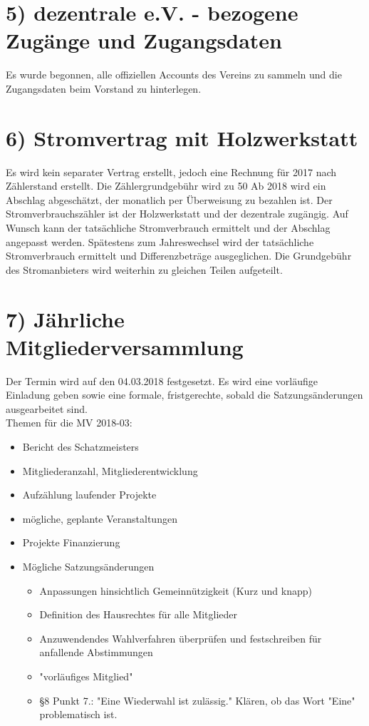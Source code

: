 \documentclass[10pt,a4paper]{scrartcl}
\newcommand{\qs}[1]{"#1"}
\begin{document}
\section*{5) dezentrale e.V. - bezogene Zug{\"a}nge und Zugangsdaten}
Es wurde begonnen, alle offiziellen Accounts des Vereins zu sammeln und die Zugangsdaten beim Vorstand zu hinterlegen.

\section*{6) Stromvertrag mit Holzwerkstatt}
	Es wird kein separater Vertrag erstellt, jedoch eine Rechnung für 2017 nach Z{\"a}hlerstand erstellt.
	Die Z{\"a}hlergrundgeb{\"u}hr wird zu 50%
	Ab 2018 wird ein Abschlag abgesch{\"a}tzt, der monatlich per {\"U}berweisung zu bezahlen ist.
	Der Stromverbrauchsz{\"a}hler ist der Holzwerkstatt und der dezentrale zug{\"a}ngig.
	Auf Wunsch kann der tats{\"a}chliche Stromverbrauch ermittelt und der Abschlag angepasst werden.
	Sp{\"a}testens zum Jahreswechsel wird der tats{\"a}chliche Stromverbrauch ermittelt und Differenzbetr{\"a}ge ausgeglichen.
	Die Grundgeb{\"u}hr des Stromanbieters wird weiterhin zu gleichen Teilen aufgeteilt.

\section*{7) J{\"a}hrliche Mitgliederversammlung}
	Der Termin wird auf den 04.03.2018 festgesetzt. Es wird eine vorl{\"a}ufige Einladung geben sowie eine formale,
	fristgerechte, sobald die Satzungs{\"a}nderungen ausgearbeitet sind.\\
	Themen für die MV 2018-03:\\
	\begin{itemize}
	\item Bericht des Schatzmeisters
	\item Mitgliederanzahl, Mitgliederentwicklung
	\item Aufz{\"a}hlung laufender Projekte
	\item m{\"o}gliche, geplante Veranstaltungen
	\item Projekte Finanzierung
	\item M{\"o}gliche Satzungs{\"a}nderungen\\
		\begin{itemize}
		\item Anpassungen hinsichtlich Gemeinn{\"u}tzigkeit (Kurz und knapp)
		\item Definition des Hausrechtes f{\"u}r alle Mitglieder
		\item Anzuwendendes Wahlverfahren {\"u}berpr{\"u}fen und festschreiben f{\"u}r anfallende Abstimmungen
		\item \qs{vorl{\"a}ufiges Mitglied}
		\item \S8 Punkt 7.: \qs{Eine Wiederwahl ist zul{\"a}ssig.} Kl{\"a}ren, ob das Wort \qs{Eine} problematisch ist.
		\end{itemize}
	\end{itemize}
\end{document}
